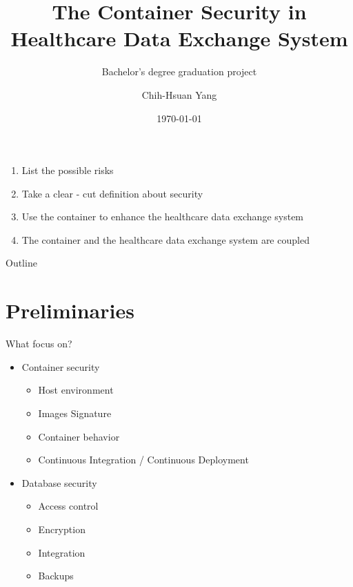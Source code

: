 \documentclass{beamer}
\title{The Container Security in Healthcare Data Exchange System}
\subtitle{Bachelor's degree graduation project}
\author{Chih-Hsuan Yang}
\institute{National Sun Yat-sen University\\
Advisor: Chun-I Fan
}
\date{\today}
\begin{document}
\begin{CJK*}{UTF8}{bsmi}

  \begin{frame}
    \titlepage
  \end{frame}

  \begin{frame}
    \begin{enumerate}
      \item {\color{secureColor} List} the possible risks
      \item Take a clear - cut {\color{secureColor}definition} about security
      \item Use the container to {\color{secureColor} enhance} the healthcare data exchange system
      \item The container and the healthcare data exchange system are {\color{secureColor} coupled}
    \end{enumerate}
  \end{frame}

  \begin{frame}{Outline}
    \begin{multicols}{2}
      \tableofcontents
    \end{multicols}
  \end{frame}

  \section{Preliminaries}
  \begin{frame}{What focus on?}
    \begin{multicols*}{2}
      \begin{itemize}
        \item Container security
              \begin{itemize}
                \item Host environment
                \item Images Signature
                \item Container behavior
                \item Continuous Integration / Continuous Deployment
              \end{itemize}
      \end{itemize}
      \begin{itemize}
        \item Database security
              \begin{itemize}
                \item Access control
                \item Encryption
                \item Integration
                \item Backups
              \end{itemize}
      \end{itemize}
    \end{multicols*}
  \end{frame}


\end{CJK*}
\end{document}
